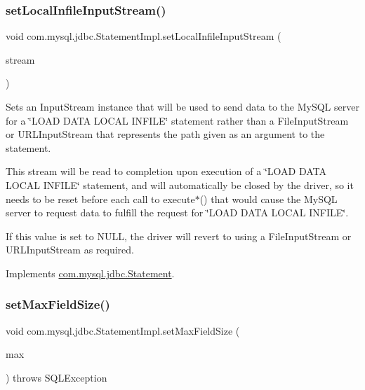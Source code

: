 \subsubsection{\texorpdfstring{set\+Local\+Infile\+Input\+Stream()}{setLocalInfileInputStream()}}
{\footnotesize\ttfamily void com.\+mysql.\+jdbc.\+Statement\+Impl.\+set\+Local\+Infile\+Input\+Stream (\begin{DoxyParamCaption}\item[{Input\+Stream}]{stream }\end{DoxyParamCaption})}

Sets an Input\+Stream instance that will be used to send data to the My\+S\+QL server for a \char`\"{}\+L\+O\+A\+D D\+A\+T\+A L\+O\+C\+A\+L I\+N\+F\+I\+L\+E\char`\"{} statement rather than a File\+Input\+Stream or U\+R\+L\+Input\+Stream that represents the path given as an argument to the statement.

This stream will be read to completion upon execution of a \char`\"{}\+L\+O\+A\+D D\+A\+T\+A L\+O\+C\+A\+L I\+N\+F\+I\+L\+E\char`\"{} statement, and will automatically be closed by the driver, so it needs to be reset before each call to execute$\ast$() that would cause the My\+S\+QL server to request data to fulfill the request for \char`\"{}\+L\+O\+A\+D D\+A\+T\+A L\+O\+C\+A\+L I\+N\+F\+I\+L\+E\char`\"{}.

If this value is set to N\+U\+LL, the driver will revert to using a File\+Input\+Stream or U\+R\+L\+Input\+Stream as required. 

Implements \mbox{\hyperlink{interfacecom_1_1mysql_1_1jdbc_1_1_statement_ac5064854dd97b64cb4e94fa5492ce65e}{com.\+mysql.\+jdbc.\+Statement}}.

\mbox{\label{classcom_1_1mysql_1_1jdbc_1_1_statement_impl_a21c0da8a415543b37cf396f85ba77ef8}} 
\subsubsection{\texorpdfstring{set\+Max\+Field\+Size()}{setMaxFieldSize()}}
{\footnotesize\ttfamily void com.\+mysql.\+jdbc.\+Statement\+Impl.\+set\+Max\+Field\+Size (\begin{DoxyParamCaption}\item[{int}]{max }\end{DoxyParamCaption}) throws S\+Q\+L\+Exception}

